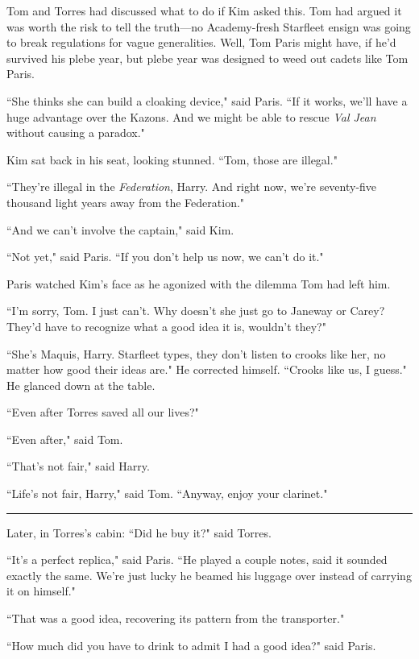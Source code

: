 \documentclass[twoside,letterpaper,12pt]{memoir}
\begin{document}
Tom and Torres had discussed what to do if Kim asked this. Tom had argued it was worth the risk to tell the truth---no Academy-fresh Starfleet ensign was going to break regulations for vague generalities. Well, Tom Paris might have, if he'd survived his plebe year, but plebe year was designed to weed out cadets like Tom Paris. 

``She thinks she can build a cloaking device," said Paris. ``If it works, we'll have a huge advantage over the Kazons. And we might be able to rescue \textit{Val Jean} without causing a paradox." 

Kim sat back in his seat, looking stunned. ``Tom, those are illegal." 

``They're illegal in the \textit{Federation}, Harry. And right now, we're seventy-five thousand light years away from the Federation." 

``And we can't involve the captain," said Kim. 

``Not yet," said Paris. ``If you don't help us now, we can't do it." 

Paris watched Kim's face as he agonized with the dilemma Tom had left him. 

``I'm sorry, Tom. I just can't. Why doesn't she just go to Janeway or Carey? They'd have to recognize what a good idea it is, wouldn't they?" 

``She's Maquis, Harry. Starfleet types, they don't listen to crooks like her, no matter how good their ideas are." He corrected himself. ``Crooks like us, I guess." He glanced down at the table. 

``Even after Torres saved all our lives?" 

``Even after," said Tom. 

``That's not fair," said Harry. 

``Life's not fair, Harry," said Tom. ``Anyway, enjoy your clarinet." 

\begin{center}\rule{3cm}{0.4 pt}\end{center} 

Later, in Torres's cabin: ``Did he buy it?" said Torres. 

``It's a perfect replica," said Paris. ``He played a couple notes, said it sounded exactly the same. We're just lucky he beamed his luggage over instead of carrying it on himself."

``That was a good idea, recovering its pattern from the transporter." 

``How much did you have to drink to admit I had a good idea?" said Paris. 
\end{document}
